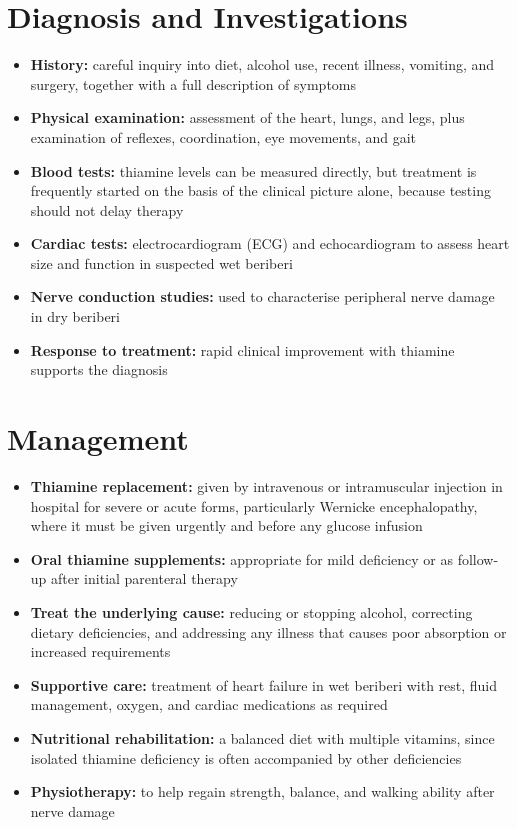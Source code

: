 \section*{Diagnosis and Investigations}
\begin{itemize}
    \item \textbf{History:} careful inquiry into diet, alcohol use, recent illness, vomiting, and surgery, together with a full description of symptoms
    \item \textbf{Physical examination:} assessment of the heart, lungs, and legs, plus examination of reflexes, coordination, eye movements, and gait
    \item \textbf{Blood tests:} thiamine levels can be measured directly, but treatment is frequently started on the basis of the clinical picture alone, because testing should not delay therapy
    \item \textbf{Cardiac tests:} electrocardiogram (ECG) and echocardiogram to assess heart size and function in suspected wet beriberi
    \item \textbf{Nerve conduction studies:} used to characterise peripheral nerve damage in dry beriberi
    \item \textbf{Response to treatment:} rapid clinical improvement with thiamine supports the diagnosis
\end{itemize}

\section*{Management}
\begin{itemize}
    \item \textbf{Thiamine replacement:} given by intravenous or intramuscular injection in hospital for severe or acute forms, particularly Wernicke encephalopathy, where it must be given urgently and before any glucose infusion
    \item \textbf{Oral thiamine supplements:} appropriate for mild deficiency or as follow-up after initial parenteral therapy
    \item \textbf{Treat the underlying cause:} reducing or stopping alcohol, correcting dietary deficiencies, and addressing any illness that causes poor absorption or increased requirements
    \item \textbf{Supportive care:} treatment of heart failure in wet beriberi with rest, fluid management, oxygen, and cardiac medications as required
    \item \textbf{Nutritional rehabilitation:} a balanced diet with multiple vitamins, since isolated thiamine deficiency is often accompanied by other deficiencies
    \item \textbf{Physiotherapy:} to help regain strength, balance, and walking ability after nerve damage
\end{itemize}


